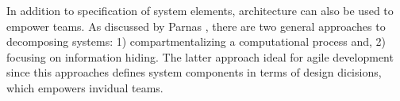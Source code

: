 In addition to specification of system elements, architecture can also be used to empower teams.
As discussed by Parnas \cite{Parnas72}, there are two general approaches to decomposing systems: 1) compartmentalizing a computational process and, 2) focusing on information hiding.
The latter approach ideal for agile development since this approaches defines system components in terms of design dicisions, which empowers invidual teams.